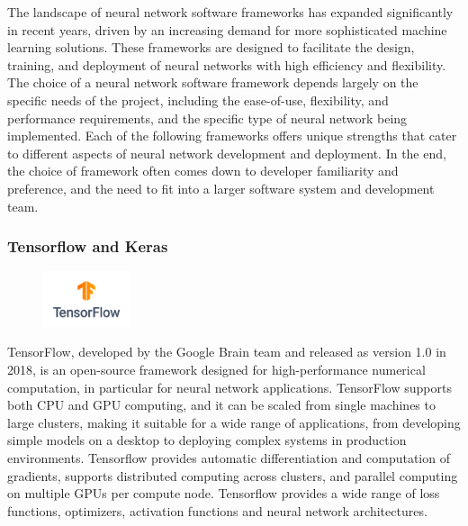 The landscape of neural network software frameworks has expanded significantly in recent years, driven by an increasing demand for more sophisticated machine learning solutions. These frameworks are designed to facilitate the design, training, and deployment of neural networks with high efficiency and flexibility. The choice of a neural network software framework depends largely on the specific needs of the project, including the ease-of-use, flexibility, and performance requirements, and the specific type of neural network being implemented. Each of the following frameworks offers unique strengths that cater to different aspects of neural network development and deployment. In the end, the choice of framework often comes down to developer familiarity and preference, and the need to fit into a larger software system and development team.

\subsubsection*{Tensorflow and Keras}

\begin{figure}
\begin{center}
\includegraphics[width=1in]{tflogo.png}
\end{center}
\end{figure}
TensorFlow, developed by the Google Brain team and released as version 1.0 in 2018, is an open-source framework designed for high-performance numerical computation, in particular for neural network applications. TensorFlow supports both CPU and GPU computing, and it can be scaled from single machines to large clusters, making it suitable for a wide range of applications, from developing simple models on a desktop to deploying complex systems in production environments. Tensorflow provides automatic differentiation and computation of gradients, supports distributed computing across clusters, and parallel computing on multiple GPUs per compute node. Tensorflow provides a wide range of loss functions, optimizers, activation functions and neural network architectures.

